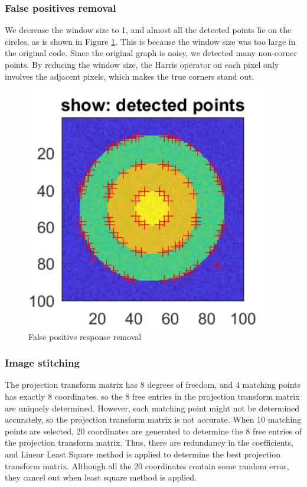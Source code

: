 \subsubsection{False positives removal}
We decrease the window size to 1, and almost all the detected points lie on the circles, as is shown in Figure \ref{fig:7}.
This is because the window size was too large in the original code.
Since the original graph is noisy, we detected many non-corner points.
By reducing the window size, the Harris operator on each pixel only involves the adjacent pixels, which makes the true corners stand out.

\begin{figure}[htbp]
	\centering
	\includegraphics[width=0.95\textwidth]{hw2/problem3/detect_rings.png}
	\caption{False positive response removal}\label{fig:7}
\end{figure}



\subsubsection{Image stitching}
The projection transform matrix has 8 degrees of freedom, and 4 matching points has exactly 8 coordinates, so the 8 free entries in the projection transform matrix are uniquely determined.
However, each matching point might not be determined accurately, so the projection transform matrix is not accurate.
When 10 matching points are selected, 20 coordinates are generated to determine the 8 free entries of the projection transform matrix.
Thus, there are redundancy in the coefficients, and Linear Least Square method is applied to determine the best projection transform matrix.
Although all the 20 coordinates contain some random error, they cancel out when least square method is applied.

